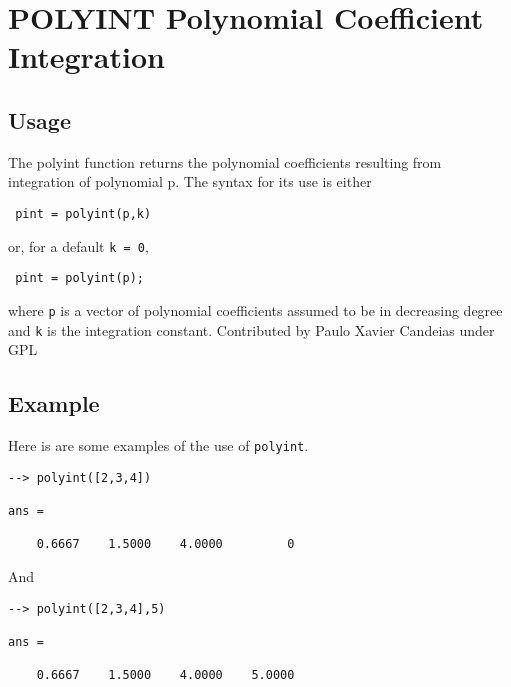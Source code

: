 \section{POLYINT Polynomial Coefficient Integration}

\subsection{Usage}

 The polyint function returns the polynomial coefficients resulting
 from integration of polynomial p. The syntax for its use is either
\begin{verbatim}
 pint = polyint(p,k)
\end{verbatim}
 or, for a default \verb|k = 0|,
\begin{verbatim}
 pint = polyint(p);
\end{verbatim}
 where \verb|p| is a vector of polynomial coefficients assumed to be in
 decreasing degree and \verb|k| is the integration constant.
 Contributed by Paulo Xavier Candeias under GPL
\subsection{Example}

Here is are some examples of the use of \verb|polyint|.
\begin{verbatim}
--> polyint([2,3,4])

ans = 

    0.6667    1.5000    4.0000         0 
\end{verbatim}
And
\begin{verbatim}
--> polyint([2,3,4],5)

ans = 

    0.6667    1.5000    4.0000    5.0000 
\end{verbatim}
